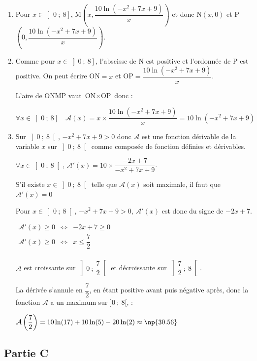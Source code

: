 \begin{enumerate}
	\item Pour $x\in \left]0~;~8\right]$, M$\left(x,\dfrac{10\ln\left(-x^2 + 7x + 9\right)}{x}\right)$ et donc N$\left(x,0\right)$ et P$\left(0,\dfrac{10\ln\left(-x^2 + 7x + 9\right)}{x}\right)$.
	\item Comme pour $x\in \left]0~;~8\right]$, l'abscisse de N est positive et l'ordonnée de P est positive. On peut écrire ON$=x$ et OP$=\dfrac{10\ln\left(-x^2 + 7x + 9\right)}{x}$.
	
	L'aire de ONMP vaut $\text{ON}\times\text{OP}$ donc : 
	
	$\forall x \in \left]0~;~8\right]\quad \mathcal{A}(x) = x\times \dfrac{10\ln\left(-x^2 + 7x + 9\right)}{x} = 10\ln\left(-x^2 + 7x + 9\right)$
	\item Sur $\left]0~;~8\right[$, $-x^2 + 7x + 9 > 0$ donc $\mathcal{A}$ est une fonction dérivable de la variable $x$ sur $\left]0~;~8\right[$ comme composée de fonction définies et dérivables. 
	
	$\forall x\in \left]0~;~8\right[$, $\mathcal{A}'(x) = 10\times \dfrac{-2x + 7}{-x^2 + 7x +9}$.
	
	S'il existe $x\in \left]0~;~8\right[$ telle que $\mathcal{A}(x)$ soit maximale, il faut que $\mathcal{A}'(x) = 0$
	
	Pour $x\in \left]0~;~8\right[$, $-x^2 + 7x +9 > 0 $,  $\mathcal{A}'(x)$ est donc du signe de $-2x + 7$.
	
	$
	\begin{array}{ccc}
	\mathcal{A}'(x) \geqslant 0 &\iff& -2x + 7 \geqslant 0 \\
	\mathcal{A}'(x) \geqslant 0 &\iff& x \leqslant \dfrac{7}{2} \\
	\end{array}
	$

	$\mathcal{A}$ est croissante sur $\left]0~;~\dfrac{7}{2}\right[$ et décroissante sur  $\left]\dfrac{7}{2}~;~8\right[$.
	
	La dérivée s'annule en $\dfrac{7}{2}$, en étant positive avant puis négative après, donc la fonction $\mathcal{A}$ a un maximum sur $]0~;~8[$, : 
	
	$\mathcal{A}\left(\dfrac{7}{2}\right) = 10\ln(17)+ 10\ln(5)-20\ln(2) \approx \np{30.56}$
	
	\end{enumerate}
	
\subsection*{Partie C}

